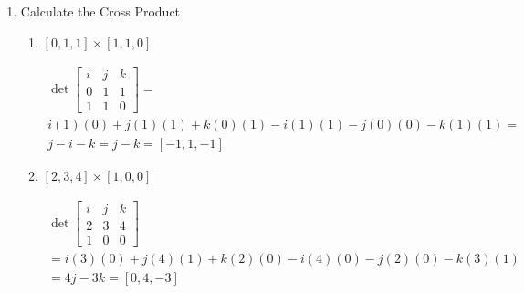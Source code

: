 \documentclass{article}
\begin{document}
\begin{enumerate}
\begin{mdframed}
                And the length:
                \begin{gather}
                    |[1, 5]| = \sqrt{1 + 5^2}\\
                    = \sqrt{26}\\
                    \approx 5.099
                \end{gather}
            \end{mdframed}
            \break
        \item Calculate the Cross Product
            \begin{enumerate}
                \item $[0,1,1] \times [1,1,0]$
                    \begin{mdframed}
                        \begin{gather}
                            \det{\begin{bmatrix}
                                i & j & k\\ 
                                0 & 1 & 1\\
                                1 & 1 & 0
                        \end{bmatrix}} = \\
                        i(1)(0) + j(1)(1) + k(0)(1) - i(1)(1)
                        - j(0)(0) - k(1)(1) = \\
                        j - i - k = j - k = [-1, 1, -1]
                        \end{gather}       
                    \end{mdframed}
                \item $[2, 3, 4] \times [1, 0, 0]$
                    \begin{mdframed}
                        \begin{gather}
                            \det{
                                \begin{bmatrix}
                                    i & j & k\\ 
                                    2 & 3 & 4\\
                                    1 & 0 & 0
                                \end{bmatrix}
                            } \\
                            = i(3)(0) + j(4)(1) + k(2)(0)
                            - i(4)(0) - j(2)(0) - k(3)(1)\\
                            = 4j - 3k = [0, 4, -3]
                        \end{gather}

\end{mdframed}
\end{enumerate}
\end{enumerate}
\end{document}
